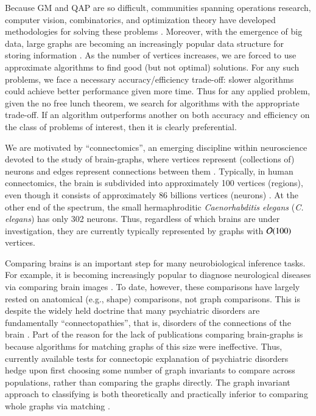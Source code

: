 \documentclass[preprint,11pt]{elsarticle}
\begin{document}
Because GM and QAP are so difficult, communities spanning operations research, computer vision, combinatorics, and optimization theory have developed methodologies for solving these problems \cite{Conte2004, Burkard2009}.  Moreover, with the emergence of big data, large graphs are becoming an increasingly popular data structure for storing information \cite{Kolaczyk2010}. As the number of vertices increases, we are forced to use approximate algorithms to find good (but not optimal) solutions.  For any such problems, we face a necessary accuracy/efficiency trade-off: slower algorithms could achieve better performance given more time.  Thus for any applied problem, given the no free lunch theorem, we search for algorithms with the appropriate trade-off.  If an algorithm outperforms another on both accuracy and efficiency on the class of problems of interest, then it is clearly preferential.  

We are motivated by ``connectomics'',  an emerging discipline within neuroscience devoted to the study of brain-graphs, where vertices represent (collections of) neurons and edges represent connections between them \cite{SpornsKotter05, Hagmann05}.  Typically, in human connectomics, the brain is subdivided into approximately 100 vertices (regions), even though it consists of approximately 86 billions vertices (neurons) \cite{Herculano-Houzel2012}.   At the other end of the spectrum, the small hermaphroditic  \emph{Caenorhabditis elegans} (\emph{C. elegans}) has only 302 neurons.  Thus, regardless of which brains are under investigation, they are currently typically represented by graphs with $\mathcal{O}(100)$ vertices.  

Comparing brains is an important step for many neurobiological inference tasks.  For example, it is becoming increasingly popular to diagnose neurological diseases via comparing brain images \cite{Csernansky2004}.  To date, however, these comparisons have largely rested on anatomical (e.g., shape) comparisons, not graph comparisons.  This is despite the widely held doctrine that many
psychiatric disorders are fundamentally ``connectopathies'', that is, disorders of the connections of the brain \cite{Kubicki2007,Calhoun2011,Fornito2012,Fornito2012a}. 
Part of the reason for the lack of publications comparing brain-graphs is because algorithms for matching graphs of this size were ineffective.  
Thus, currently available tests for connectopic explanation of psychiatric disorders hedge upon first choosing some number of graph invariants to compare across populations, rather than comparing the graphs directly. The graph invariant approach to classifying is both theoretically and practically inferior to comparing whole graphs via matching \cite{VP11_unlabeled}.  
\end{document}
